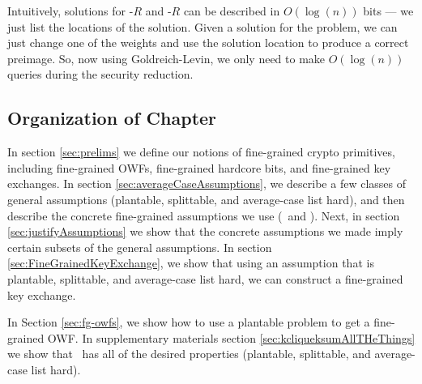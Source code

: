 Intuitively, solutions for \kSum-$R$ and \zkclique-$R$ can be described in $O(\log(n))$ bits --- we just list the locations of the solution. Given a solution for the problem, we can just change one of the weights and use the solution location to produce a correct preimage. So, now using Goldreich-Levin, we only need to make $O(\log(n))$ queries during the security reduction.






%



\subsection{Organization of Chapter}

In section \ref{sec:prelims} we define our notions of fine-grained crypto primitives, including fine-grained OWFs, fine-grained hardcore bits, and  fine-grained key exchanges. In section \ref{sec:averageCaseAssumptions}, we describe a few classes of general assumptions (plantable, splittable, and average-case list hard), and then describe the concrete fine-grained assumptions we use (\kSum~and \zkclique). Next, in section \ref{sec:justifyAssumptions} we show that the concrete assumptions we made imply certain subsets of the general assumptions. 
In section \ref{sec:FineGrainedKeyExchange}, we show that using an assumption that is plantable, splittable, and average-case list hard, we can construct a fine-grained key exchange.

In Section \ref{sec:fg-owfs}, we show how to use a plantable problem to get a fine-grained OWF.
In supplementary materials section \ref{sec:kcliqueksumAllTHeThings} we show that \zkclique~has all of the desired properties (plantable, splittable, and average-case list hard).
